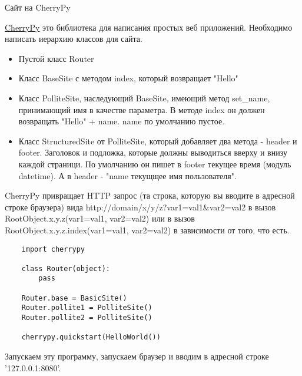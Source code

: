 \documentclass{article}
\begin{document}
\newpage

\begin{center}Сайт на CherryPy\end{center}
\href{http://www.cherrypy.org/}{CherryPy} это библиотека для написания простых веб приложений.
Необходимо написать иерархию классов для сайта. 
\begin{itemize}
    \item Пустой класс Router
    \item Класс BaseSite с методом index, который возвращает "Hello"
    \item Класс PolliteSite, наследующий BaseSite, имеющий метод set\_name,
            принимающий имя в качестве параметра.
            В методе index он должен возвращать "Hello" + name. name по умолчанию пустое.
    \item Класс StructuredSite от PolliteSite, который добавляет два метода - header и footer.
          Заголовок и подложка, которые должны выводиться вверху и внизу каждой страници.
          По умолчанию он пишет в footer текущее время (модуль datetime). А в header - 
          "name {текущщее имя пользователя}".

\end{itemize}

CherryPy привращает HTTP запрос (та строка, которую вы вводите в адресной строке браузера)
вида http://domain/x/y/z?var1=val1\&var2=val2
в вызов RootObject.x.y.z(var1=val1, var2=val2) или в вызов \\
RootObject.x.y.z.index(var1=val1, var2=val2) в зависимости от того, что есть.

\begin{lstlisting}
    import cherrypy

    class Router(object):
        pass

    Router.base = BasicSite()
    Router.pollite1 = PolliteSite()
    Router.pollite2 = PolliteSite()

    cherrypy.quickstart(HelloWorld())
\end{lstlisting}

Запускаем эту программу, запускаем браузер и вводим в адресной строке '127.0.0.1:8080'.

\newpage
\end{document}
